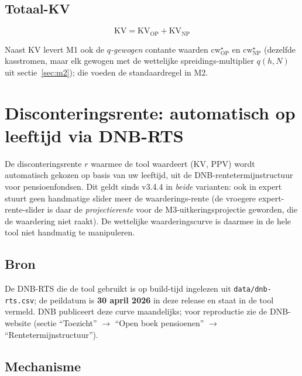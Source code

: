 \documentclass[11pt,a4paper]{article}
\newcommand{\code}[1]{\texttt{#1}}
\begin{document}
\subsection{Totaal-KV}

\begin{equation}
\text{KV} = \text{KV}_{\text{OP}} + \text{KV}_{\text{NP}}
\end{equation}

Naast KV levert M1 ook de \emph{$q$-gewogen} contante waarden $\text{cw}^{\star}_{\text{OP}}$ en $\text{cw}^{\star}_{\text{NP}}$ (dezelfde kasstromen, maar elk gewogen met de wettelijke spreidings-multiplier $q(h,N)$ uit sectie~\ref{sec:m2}); die voeden de standaardregel in M2.

\section{Disconteringsrente: automatisch op leeftijd via DNB-RTS}
\label{sec:rente}

De disconteringsrente $r$ waarmee de tool waardeert (KV, PPV) wordt automatisch gekozen op basis van uw leeftijd, uit de DNB-rentetermijnstructuur voor pensioenfondsen. Dit geldt sinds v3.4.4 in \emph{beide} varianten: ook in expert stuurt geen handmatige slider meer de waarderings-rente (de vroegere expert-rente-slider is daar de \emph{projectierente} voor de M3-uitkeringsprojectie geworden, die de waardering niet raakt). De wettelijke waarderingscurve is daarmee in de hele tool niet handmatig te manipuleren.

\subsection{Bron}

De DNB-RTS die de tool gebruikt is op build-tijd ingelezen uit \code{data/dnb-rts.csv}; de peildatum is \textbf{30 april 2026} in deze release en staat in de tool vermeld. DNB publiceert deze curve maandelijks; voor reproductie zie de DNB-website (sectie ``Toezicht'' $\to$ ``Open boek pensioenen'' $\to$ ``Rentetermijnstructuur'').

\subsection{Mechanisme}
\end{document}
